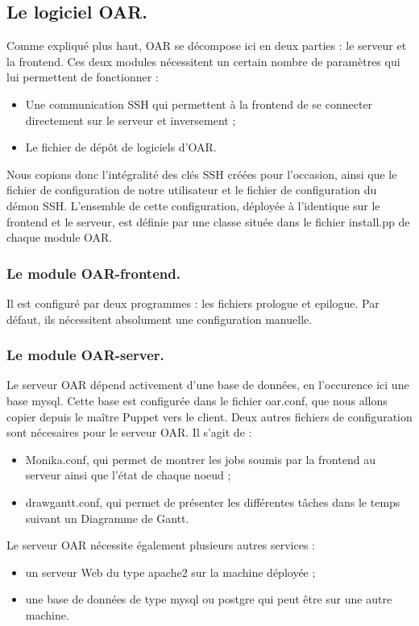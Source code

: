\documentclass[a4paper,10pt]{article}
\begin{document}
			\subsection{Le logiciel OAR.}
			Comme expliqué plus haut, OAR se décompose ici en deux parties : le serveur et la frontend. Ces deux modules nécessitent un certain nombre de paramètres qui lui permettent de fonctionner :
				\begin{itemize}
					\item Une communication SSH qui permettent à la frontend de se connecter directement sur le serveur et inversement ;
					\item Le fichier de dép\^ot de logiciels d'OAR.
				\end{itemize}
				Nous copions donc l'intégralité des clés SSH créées pour l'occasion, ainsi que le fichier de configuration de notre utilisateur et le fichier de configuration du démon SSH.	
				L'ensemble de cette configuration, déployée à l'identique sur le frontend et le serveur, est définie par une classe située dans le fichier install.pp de chaque module OAR. 

			\subsubsection{Le module OAR-frontend.}
			Il est configuré par deux programmes : les fichiers prologue et epilogue. Par défaut, ils nécessitent absolument une configuration manuelle.
			\subsubsection{Le module OAR-server.}
		Le serveur OAR dépend activement d'une base de données, en l'occurence ici une base mysql. Cette base est configurée dans le fichier oar.conf, que nous allons copier depuis le maître Puppet vers le client.
		Deux autres fichiers de configuration sont nécesaires pour le serveur OAR. Il s'agit de : \begin{itemize}
		\item Monika.conf, qui permet de montrer les jobs soumis par la frontend au serveur ainsi que l'état de chaque noeud ;
		\item drawgantt.conf, qui permet de présenter les différentes tâches dans le temps suivant un Diagramme de Gantt.
\end{itemize}
Le serveur OAR nécessite également plusieurs autres services :
\begin{itemize}
\item un serveur Web du type apache2 sur la machine déployée ;
\item une base de données de type mysql ou postgre qui peut être sur une autre machine.
\end{itemize}
\end{document}
